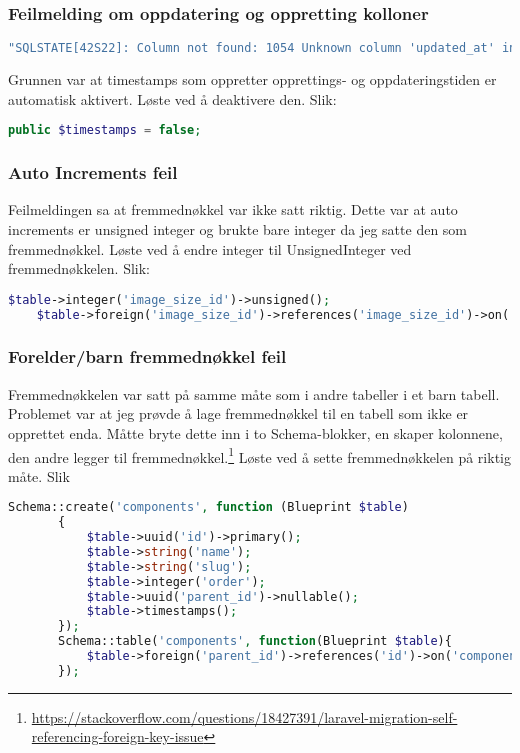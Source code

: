 \subsubsection{Feilmelding om oppdatering og oppretting kolloner}
\begin{lstlisting}[language=PHP]
    "SQLSTATE[42S22]: Column not found: 1054 Unknown column 'updated_at' in 'field list' (SQL: insert into `image_sizes` (`name`, `max_width`, `max_height`, `id`, `updated_at`, `created_at`) values (size-name, 10, 20, 879d1360-9a74-46f8-b383-ff6ec6e0f387, 2019-02-07 21:08:09, 2019-02-07 21:08:09))
\end{lstlisting}
Grunnen var at timestamps som oppretter opprettings- og oppdateringstiden er automatisk aktivert.
Løste ved å deaktivere den. Slik: 

\begin{lstlisting}[language=PHP]
    public $timestamps = false;
\end{lstlisting}

\subsubsection{Auto Increments feil}
Feilmeldingen sa at fremmednøkkel var ikke satt riktig.
Dette var at auto increments er unsigned integer og brukte bare integer da jeg satte den som fremmednøkkel.
Løste ved å endre integer til UnsignedInteger ved fremmednøkkelen. Slik:

\begin{lstlisting}[language=PHP]
    $table->integer('image_size_id')->unsigned();
    $table->foreign('image_size_id')->references('image_size_id')->on('image_sizes');
\end{lstlisting}

\subsubsection{Forelder/barn fremmednøkkel feil}
Fremmednøkkelen var satt på samme måte som i andre tabeller i et barn tabell. Problemet var at jeg prøvde å lage fremmednøkkel til en tabell som ikke er opprettet enda.
Måtte bryte dette inn i to Schema-blokker, en skaper kolonnene, den andre legger til fremmednøkkel.\footnote{\url{https://stackoverflow.com/questions/18427391/laravel-migration-self-referencing-foreign-key-issue}}
Løste ved å sette fremmednøkkelen på riktig måte. Slik
\begin{lstlisting}[language=PHP]
Schema::create('components', function (Blueprint $table)
       {
           $table->uuid('id')->primary();
           $table->string('name');
           $table->string('slug');
           $table->integer('order');
           $table->uuid('parent_id')->nullable();
           $table->timestamps();
       });
       Schema::table('components', function(Blueprint $table){
           $table->foreign('parent_id')->references('id')->on('components');
       });
\end{lstlisting}

